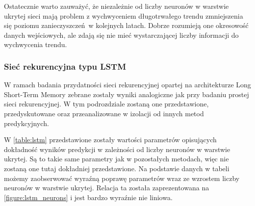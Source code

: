 \documentclass[10pt,a4paper]{article}
\begin{document}
Ostatecznie warto zauważyć, że niezależnie od liczby neuronów w warstwie ukrytej sieci mają problem z wychwyceniem długotrwałego trendu zmniejszenia się poziomu zanieczyszczeń w kolejnych latach. Dobrze rozumieją one okresowość danych wejściowych, ale zdają się nie mieć wystarczającej liczby informacji do wychwycenia trendu. 

\subsubsection{Sieć rekurencyjna typu LSTM}
W ramach badania przydatności sieci rekurencyjnej opartej na architekturze Long Short-Term Memory zebrane zostały wyniki analogiczne jak przy badaniu prostej sieci rekurencyjnej. W tym podrozdziale zostaną one przedstawione, przedyskutowane oraz przeanalizowane w izolacji od innych metod predykcyjnych. 

W \autoref{table:lstm} przedstawione zostały wartości parametrów opisujących dokładność wyników predykcji w zależności od liczby neuronów w warstwie ukrytej. Są to takie same parametry jak w pozostałych metodach, więc nie zostaną one tutaj dokładniej przedstawione. Na podstawie danych w tabeli możemy zaobserwować wyraźną poprawę parametrów wraz ze wzrostem liczby neuronów w warstwie ukrytej. Relacja ta została zaprezentowana na \autoref{figure:lstm_neurons} i jest bardzo wyraźnie nie liniowa. 
\end{document}
